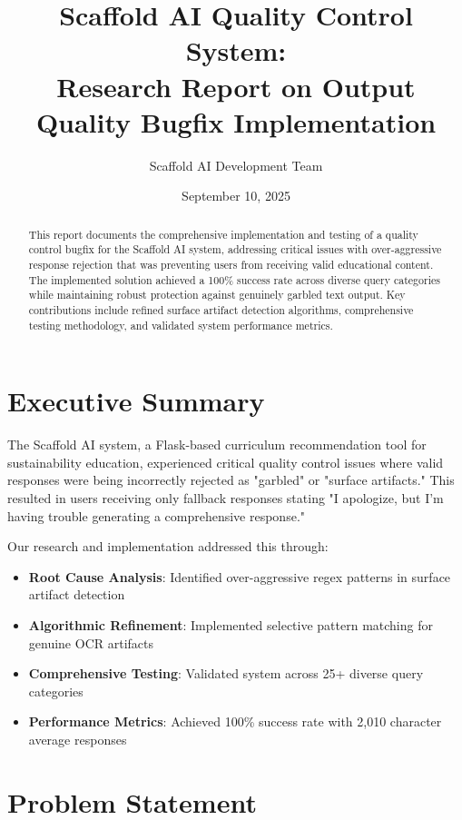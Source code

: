 \documentclass[12pt,a4paper]{article}
\title{\textbf{Scaffold AI Quality Control System: \\ Research Report on Output Quality Bugfix Implementation}}
\author{Scaffold AI Development Team}
\date{September 10, 2025}
\begin{document}
\maketitle

\begin{abstract}
This report documents the comprehensive implementation and testing of a quality control bugfix for the Scaffold AI system, addressing critical issues with over-aggressive response rejection that was preventing users from receiving valid educational content. The implemented solution achieved a 100\% success rate across diverse query categories while maintaining robust protection against genuinely garbled text output. Key contributions include refined surface artifact detection algorithms, comprehensive testing methodology, and validated system performance metrics.
\end{abstract}

\tableofcontents
\newpage

\section{Executive Summary}

The Scaffold AI system, a Flask-based curriculum recommendation tool for sustainability education, experienced critical quality control issues where valid responses were being incorrectly rejected as "garbled" or "surface artifacts." This resulted in users receiving only fallback responses stating "I apologize, but I'm having trouble generating a comprehensive response."

Our research and implementation addressed this through:
\begin{itemize}
    \item \textbf{Root Cause Analysis}: Identified over-aggressive regex patterns in surface artifact detection
    \item \textbf{Algorithmic Refinement}: Implemented selective pattern matching for genuine OCR artifacts
    \item \textbf{Comprehensive Testing}: Validated system across 25+ diverse query categories
    \item \textbf{Performance Metrics}: Achieved 100\% success rate with 2,010 character average responses
\end{itemize}

\section{Problem Statement}
\end{document}
